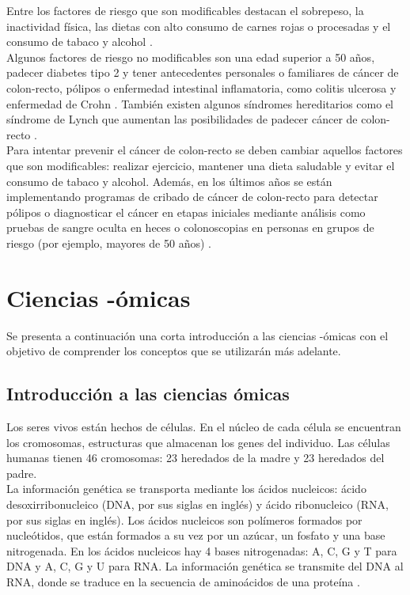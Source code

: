 Entre los factores de riesgo que son modificables destacan el sobrepeso, la inactividad física, las dietas con alto consumo de carnes rojas o procesadas y el consumo de tabaco y alcohol \cite{AmericanCancerSociety2020}.\\

Algunos factores de riesgo no modificables son una edad superior a 50 años, padecer diabetes tipo 2 y tener antecedentes personales o familiares de cáncer de colon-recto, pólipos o enfermedad intestinal inflamatoria, como colitis ulcerosa y enfermedad de Crohn \cite{AmericanCancerSociety2020}. También existen algunos síndromes hereditarios como el síndrome de Lynch que aumentan las posibilidades de padecer cáncer de colon-recto \cite{Lynch2003}.\\

Para intentar prevenir el cáncer de colon-recto se deben cambiar aquellos factores que son modificables: realizar ejercicio, mantener una dieta saludable y evitar el consumo de tabaco y alcohol. Además, en los últimos años se están implementando programas de cribado de cáncer de colon-recto para detectar pólipos o diagnosticar el cáncer en etapas iniciales mediante análisis como pruebas de sangre oculta en heces o colonoscopias en personas en grupos de riesgo (por ejemplo, mayores de 50 años) \cite{Levin2008}.


\section{Ciencias -ómicas}

Se presenta a continuación una corta introducción a las ciencias -ómicas con el objetivo de comprender los conceptos que se utilizarán más adelante.

\subsection{Introducción a las ciencias ómicas}

Los seres vivos están hechos de células. En el núcleo de cada célula se encuentran los cromosomas, estructuras que almacenan los genes del individuo. Las células humanas tienen 46 cromosomas: 23 heredados de la madre y 23 heredados del padre.\\

La información genética se transporta mediante los ácidos nucleicos: ácido desoxirribonucleico (DNA, por sus siglas en inglés) y ácido ribonucleico (RNA, por sus siglas en inglés). Los ácidos nucleicos son polímeros formados por nucleótidos, que están formados a su vez por un azúcar, un fosfato y una base nitrogenada. En los ácidos nucleicos hay 4 bases nitrogenadas: A, C, G y T para DNA y A, C, G y U para RNA. La información genética se transmite del DNA al RNA, donde se traduce en la secuencia de aminoácidos de una proteína \cite{Pierce2010}.

